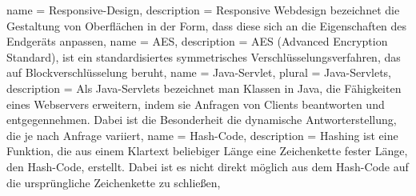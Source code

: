 {
  name = Responsive-Design,
  description = {Responsive Webdesign bezeichnet die Gestaltung von Oberflächen in der Form, dass diese sich an die Eigenschaften des Endgeräts anpassen},
}
{
  name = AES,
  description = {AES (Advanced Encryption Standard), ist ein standardisiertes symmetrisches Verschlüsselungsverfahren, das auf Blockverschlüsselung beruht},
}
{
  name = Java-Servlet,
  plural = Java-Servlets,
  description = {Als Java-Servlets bezeichnet man Klassen in Java, die Fähigkeiten eines Webservers erweitern, indem sie Anfragen von Clients beantworten und entgegennehmen. Dabei ist die Besonderheit die dynamische Antworterstellung, die je nach Anfrage variiert},
}
{
  name = Hash-Code,
  description = {Hashing ist eine Funktion, die aus einem Klartext beliebiger Länge eine Zeichenkette fester Länge, den Hash-Code, erstellt. Dabei ist es nicht direkt möglich aus dem Hash-Code auf die ursprüngliche Zeichenkette zu schließen},
}

